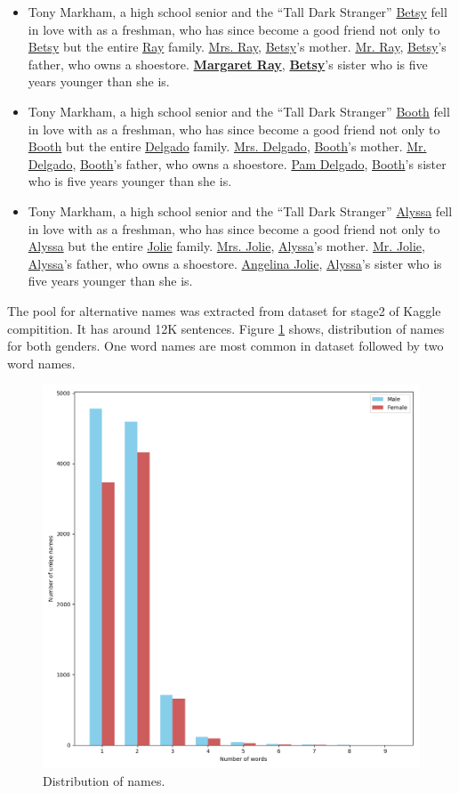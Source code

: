 \documentclass[11pt,a4paper]{article}
\begin{document}
\begin{itemize}
\item Tony Markham, a high school senior and the ``Tall Dark Stranger'' \underline{Betsy} fell in love with as a freshman, who has since become a good friend not only to \underline{Betsy} but the entire \underline{Ray} family. \underline{Mrs. Ray}, \underline{Betsy}'s mother. \underline{Mr. Ray}, \underline{Betsy}'s father, who owns a shoestore. \textbf{\underline{Margaret Ray}}, \textbf{\underline{Betsy}}'s sister who is five years younger than she is.
  
\item Tony Markham, a high school senior and the ``Tall Dark Stranger'' \underline{Booth} fell in love with as a freshman, who has since become a good friend not only to \underline{Booth} but the entire \underline{Delgado} family. \underline{Mrs. Delgado}, \underline{Booth}'s mother. \underline{Mr. Delgado}, \underline{Booth}'s father, who owns a shoestore. \underline{Pam Delgado}, \underline{Booth}'s sister who is five years younger than she is.

\item Tony Markham, a high school senior and the ``Tall Dark Stranger'' \underline{Alyssa} fell in love with as a freshman, who has since become a good friend not only to \underline{Alyssa} but the entire \underline{Jolie} family. \underline{Mrs. Jolie}, \underline{Alyssa}'s mother. \underline{Mr. Jolie}, \underline{Alyssa}'s father, who owns a shoestore. \underline{Angelina Jolie}, \underline{Alyssa}'s sister who is five years younger than she is.
\end{itemize}

  
  The pool for alternative names was extracted from dataset for stage2 of Kaggle compitition. It has around 12K sentences. Figure \ref{fig:augment_dist} shows, distribution of names for both genders. One word names are most common in dataset followed by two word names.

  \begin{figure}
    \centering
    \includegraphics[width=.5\textwidth]{augment_dist.png}
    \caption{Distribution of names.}
    \label{fig:augment_dist}
  \end{figure}
  
  



\appendix
\end{document}
